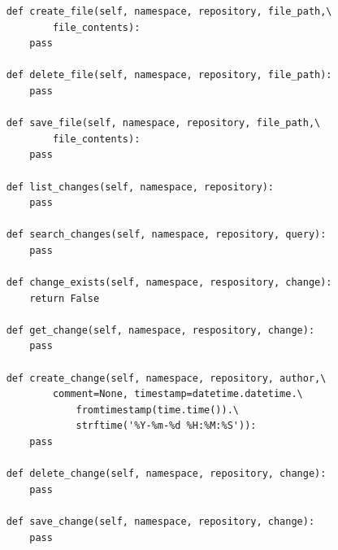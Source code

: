 \begin{lstlisting}
    def create_file(self, namespace, repository, file_path,\
            file_contents):
        pass

    def delete_file(self, namespace, repository, file_path):
        pass

    def save_file(self, namespace, repository, file_path,\
            file_contents):
        pass
    
    def list_changes(self, namespace, repository):
        pass

    def search_changes(self, namespace, repository, query):
        pass

    def change_exists(self, namespace, respository, change):
        return False

    def get_change(self, namespace, respository, change):
        pass

    def create_change(self, namespace, repository, author,\
            comment=None, timestamp=datetime.datetime.\
                fromtimestamp(time.time()).\
                strftime('%Y-%m-%d %H:%M:%S')):
        pass

    def delete_change(self, namespace, repository, change):
        pass

    def save_change(self, namespace, repository, change):
        pass
\end{lstlisting}
\lstset{language=Bash}

